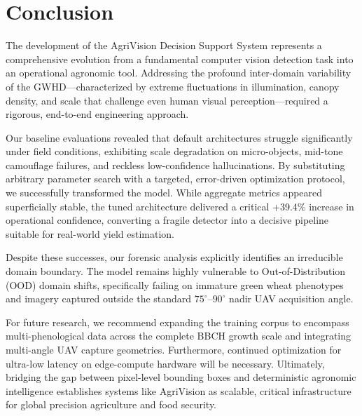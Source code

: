 \section{Conclusion}
\label{sec:conclusion}

The development of the AgriVision Decision Support System represents a comprehensive evolution from a fundamental computer vision detection task into an operational agronomic tool. Addressing the profound inter-domain variability of the GWHD—characterized by extreme fluctuations in illumination, canopy density, and scale that challenge even human visual perception—required a rigorous, end-to-end engineering approach.

Our baseline evaluations revealed that default architectures struggle significantly under field conditions, exhibiting scale degradation on micro-objects, mid-tone camouflage failures, and reckless low-confidence hallucinations. By substituting arbitrary parameter search with a targeted, error-driven optimization protocol, we successfully transformed the model. While aggregate metrics appeared superficially stable, the tuned architecture delivered a critical +39.4\% increase in operational confidence, converting a fragile detector into a decisive pipeline suitable for real-world yield estimation. 

Despite these successes, our forensic analysis explicitly identifies an irreducible domain boundary. The model remains highly vulnerable to Out-of-Distribution (OOD) domain shifts, specifically failing on immature green wheat phenotypes and imagery captured outside the standard $75^\circ$--$90^\circ$ nadir UAV acquisition angle. 

For future research, we recommend expanding the training corpus to encompass multi-phenological data across the complete BBCH growth scale and integrating multi-angle UAV capture geometries. Furthermore, continued optimization for ultra-low latency on edge-compute hardware will be necessary. Ultimately, bridging the gap between pixel-level bounding boxes and deterministic agronomic intelligence establishes systems like AgriVision as scalable, critical infrastructure for global precision agriculture and food security.
